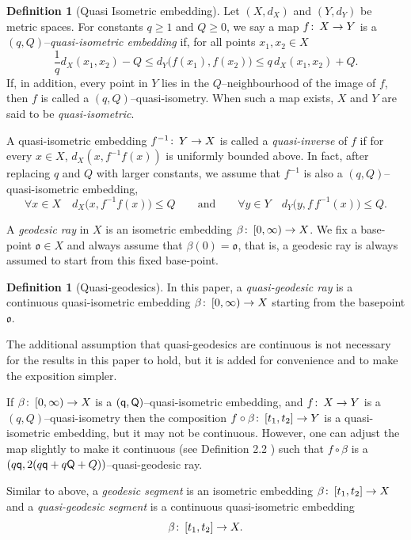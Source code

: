 \documentclass[12 pt]{amsart}
\newcommand{\gothic}{\mathfrak}
\newcommand{\go}{{\gothic o}}
\theoremstyle{definition}
\newtheorem{definition}[theorem]{Definition}
\theoremstyle{remark}
\newcommand{\sQ}{{\sf Q}}
\newcommand{\qq}{{\sf q}}
\newcommand{\from}{\colon\thinspace}
\begin{document}
\begin{definition}[Quasi Isometric embedding] \label{Def:Quasi-Isometry} 
Let $(X , d_X)$ and $(Y , d_Y)$ be metric spaces. For constants $q \geq 1$ and
$Q \geq 0$, we say a map $f \from X \to Y$ is a 
$(q, Q)$--\textit{quasi-isometric embedding} if, for all points $x_1, x_2 \in X$
$$
\frac{1}{q} d_X (x_1, x_2) - Q  \leq d_Y \big(f (x_1), f (x_2)\big) 
   \leq q \, d_X (x_1, x_2) + Q.
$$
If, in addition, every point in $Y$ lies in the $Q$--neighbourhood of the image of 
$f$, then $f$ is called a $(q, Q)$--quasi-isometry. When such a map exists, $X$ 
and $Y$ are said to be \textit{quasi-isometric}. 

A quasi-isometric embedding $f^{-1} \from Y \to X$ is called a \emph{quasi-inverse} of 
$f$ if for every $x \in X$, $d_X(x, f^{-1}f(x))$ is uniformly bounded above. 
In fact, after replacing $q$ and $Q$ with larger constants, we assume that 
$f^{-1}$ is also a $(q, Q)$--quasi-isometric embedding, 
\[
\forall x \in X \quad d_X\big(x, f^{-1}f(x)\big) \leq Q \qquad\text{and}\qquad
\forall y \in Y \quad d_Y\big(y, f\,f^{-1}(x)\big) \leq Q.
\]
\end{definition}


A \emph{geodesic ray} in $X$ is an isometric embedding $\beta \from [0, \infty) \to X$. We fix a base-point $\go \in X$ and always assume that $\beta(0) = \go$, that is, a geodesic ray is always assumed to start from this fixed base-point. 
\begin{definition}[Quasi-geodesics] \label{Def:Quadi-Geodesic} 
In this paper, a \emph{quasi-geodesic ray} is a continuous quasi-isometric 
embedding $\beta \from [0, \infty) \to X$  starting from the basepoint $\go$. 
\end{definition}
The additional assumption that quasi-geodesics are continuous is not necessary for the results in this paper to hold, but it is added for convenience and to make the exposition simpler. 

If $\beta \from [0,\infty) \to X$ is a $(\qq, \sQ)$--quasi-isometric embedding, and $f \from X \to Y$ is a $(q, Q)$--quasi-isometry then the composition  $f \circ \beta \from [t_{1}, t_{2}] \to Y$ is a quasi-isometric embedding, but it may not be continuous. However, one can adjust the map slightly to make it continuous (see Definition 2.2 \cite{QRT1}) such that $f \circ \beta$ is a $(q\qq, 2(q\qq + q \sQ + Q))$--quasi-geodesic ray.  


Similar to above, a \emph{geodesic segment} is an isometric embedding 
$\beta \from [t_{1}, t_{2}] \to X$ and a \emph{quasi-geodesic segment} is a continuous 
quasi-isometric embedding \[\beta \from [t_{1}, t_{2}] \to X.\] 
\end{document}
